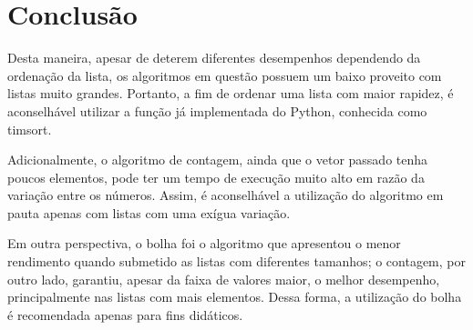 \section{Conclusão}
Desta maneira, apesar de deterem diferentes desempenhos dependendo da ordenação da lista, os algoritmos em questão possuem um baixo proveito com listas muito grandes. Portanto, a fim de ordenar uma lista com maior rapidez, é aconselhável utilizar a função já implementada do Python, conhecida como timsort.

Adicionalmente, o algoritmo de contagem, ainda que o vetor passado tenha poucos elementos, pode ter um tempo de execução muito alto em razão da variação entre os números. Assim, é aconselhável a utilização do algoritmo em pauta apenas com listas com uma exígua variação.

Em outra perspectiva, o bolha foi o algoritmo que apresentou o menor rendimento quando submetido as listas com diferentes tamanhos; o contagem, por outro lado, garantiu, apesar da faixa de valores maior, o melhor desempenho, principalmente nas listas com mais elementos. Dessa forma, a utilização do bolha é recomendada apenas para fins didáticos.
